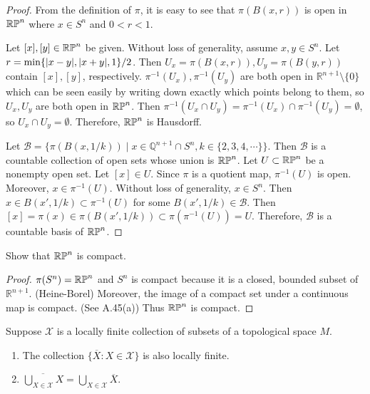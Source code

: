 \begin{proof}
  From the definition of $\pi$, it is easy to see that $\pi(B(x, r))$ is open in $\operatorname{\mathbb{R}\mathbb{P}}^n$ where $x \in S^n$ and $0 < r < 1$.

  Let $[x], [y] \in \operatorname{\mathbb{R}\mathbb{P}}^n$ be given.
  Without loss of generality, assume $x, y \in S^{n}$.
  Let $r = \min\{ \abs{x - y}, \abs{x + y}, 1 \} / 2$.
  Then $U_x = \pi(B(x, r)), U_y = \pi(B(y, r))$ contain $[x], [y]$, respectively.
  $\pi^{-1}(U_x), \pi^{-1}(U_y)$ are both open in $\mathbb{R}^{n + 1} \setminus \{ 0 \}$ which can be seen easily by writing down exactly which points belong to them, so $U_x, U_y$ are both open in $\operatorname{\mathbb{R}\mathbb{P}}^n$.
  Then $\pi^{-1}(U_x \cap U_y) = \pi^{-1}(U_x) \cap \pi^{-1}(U_y) = \emptyset$, so $U_x \cap U_y = \emptyset$.
  Therefore, $\operatorname{\mathbb{R}\mathbb{P}}^n$ is Hausdorff.

  Let $\mathcal{B} = \{ \pi(B(x, 1 / k)) \mid x \in \mathbb{Q}^{n + 1} \cap S^{n}, k \in \{ 2, 3, 4, \cdots \} \}$.
  Then $\mathcal{B}$ is a countable collection of open sets whose union is $\operatorname{\mathbb{R}\mathbb{P}}^n$.
  Let $U \subset \operatorname{\mathbb{R}\mathbb{P}}^n$ be a nonempty open set.
  Let $[x] \in U$.
  Since $\pi$ is a quotient map, $\pi^{-1}(U)$ is open.
  Moreover, $x \in \pi^{-1}(U)$.
  Without loss of generality, $x \in S^{n}$.
  Then $x \in B(x', 1 / k) \subset \pi^{-1}(U)$ for some $B(x', 1 / k) \in \mathcal{B}$.
  Then $[x] = \pi(x) \in \pi(B(x', 1 / k)) \subset \pi(\pi^{-1}(U)) = U$.
  Therefore, $\mathcal{B}$ is a countable basis of $\operatorname{\mathbb{R}\mathbb{P}}^n$.
\end{proof}

\begin{customexer}{1.7}
  Show that $\operatorname{\mathbb{R}\mathbb{P}}^n$ is compact.
\end{customexer}

\begin{proof}
  $\pi(S^n) = \operatorname{\mathbb{R}\mathbb{P}}^n$ and $S^n$ is compact because it is a closed, bounded subset of $\mathbb{R}^{n + 1}$. (Heine-Borel)
  Moreover, the image of a compact set under a continuous map is compact. (See A.45(a))
  Thus $\operatorname{\mathbb{R}\mathbb{P}}^n$ is compact.
\end{proof}

\begin{customexer}{1.14}
  Suppose $\mathcal{X}$ is a locally finite collection of subsets of a topological space $M$.
  \begin{enumerate}[label=(\alph*)]
    \item 
      The collection $\{ \overline{X} : X \in \mathcal{X} \}$ is also locally finite.
    \item
      $\overline{\bigcup_{X \in \mathcal{X}} X} = \bigcup_{X \in \mathcal{X}} \overline{X}$.
  \end{enumerate}
\end{customexer}

